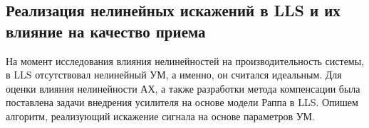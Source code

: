 





\subsection{Реализация нелинейных искажений в LLS и их влияние на качество приема}

На момент исследования влияния нелинейностей на производительность системы,
в LLS отсутствовал нелинейный УМ, а именно, он считался идеальным. Для
оценки влияния нелинейности АХ, а также разработки метода компенсации была
поставлена задачи внедрения усилителя на основе модели Раппа в LLS.
Опишем алгоритм, реализующий искажение сигнала на основе параметров УМ.

